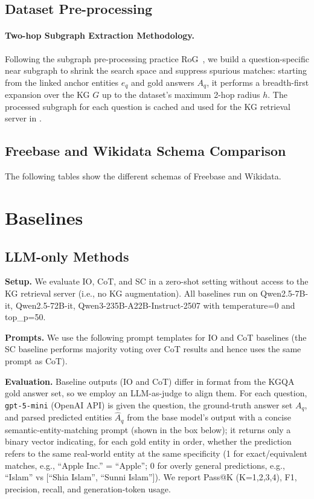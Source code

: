 \subsection{Dataset Pre-processing}

\paragraph{Two-hop Subgraph Extraction Methodology.}
Following the subgraph pre-processing practice RoG~\citep{Luo2024RoG}, we build a question-specific near subgraph to shrink the search space and suppress spurious matches: starting from the linked anchor entities \(e_q\) and gold answers \(A_q\), it performs a breadth-first expansion over the KG \(G\) up to the dataset’s maximum 2-hop radius \(h\). The processed subgraph for each question is cached and used for the KG retrieval server in \framework{}.

\subsection{Freebase and Wikidata Schema Comparison}

The following tables show the different schemas of Freebase and Wikidata.
\label{tab:datasets}








\section{Baselines}
\label{appendix:baselines}


\subsection{LLM-only Methods}
\textbf{Setup.} We evaluate IO, CoT, and SC in a zero-shot setting without access to the KG retrieval server (i.e., no KG augmentation). All baselines run on Qwen2.5-7B-it, Qwen2.5-72B-it, Qwen3-235B-A22B-Instruct-2507 with temperature=0 and top\_p=50.

\noindent\textbf{Prompts.}
We use the following prompt templates for IO and CoT baselines (the SC baseline performs majority voting over CoT results and hence uses the same prompt as CoT).



\noindent\textbf{Evaluation.} Baseline outputs (IO and CoT) differ in format from the KGQA gold answer set, so we employ an LLM-as-judge to align them. For each question, \texttt{gpt-5-mini} (OpenAI API) is given the question, the ground-truth answer set $A_q$, and parsed predicted entities $\hat{A}_q$ from the base model’s output with a concise semantic-entity-matching prompt (shown in the box below); it returns only a binary vector indicating, for each gold entity in order, whether the prediction refers to the same real-world entity at the same specificity (1 for exact/equivalent matches, e.g., “Apple Inc.” = “Apple”; 0 for overly general predictions, e.g., “Islam” vs [“Shia Islam”, “Sunni Islam”]). We report Pass@K (K=1,2,3,4), F1, precision, recall, and generation-token usage.


